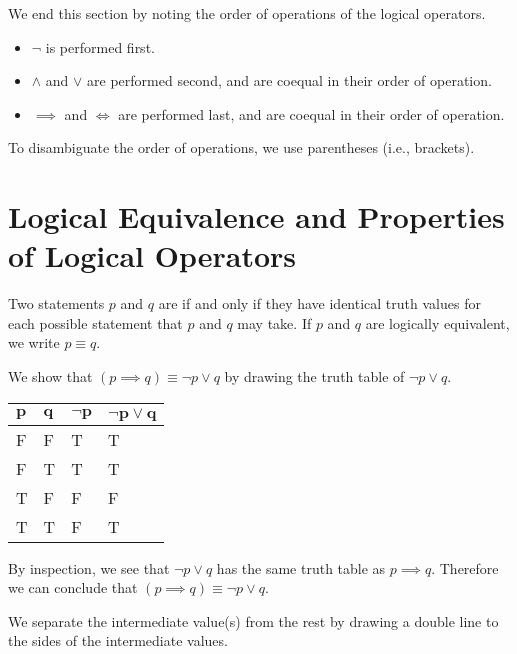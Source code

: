 We end this section by noting the order of operations of the logical operators.
\begin{itemize}
    \item $\lnot$ is performed first.
    \item $\land$ and $\lor$ are performed second, and are coequal in their order of operation.
    \item $\implies$ and $\iff$ are performed last, and are coequal in their order of operation.
\end{itemize}
To disambiguate the order of operations, we use parentheses (i.e., brackets).

\newpage

\section{Logical Equivalence and Properties of Logical Operators}
\begin{definition}
    Two statements $p$ and $q$ are  if and only if they have identical truth values for each possible statement that $p$ and $q$ may take. If $p$ and $q$ are logically equivalent, we write $p \equiv q$.
\end{definition}

\begin{example}\label{example-implication-law}
    We show that $(p \implies q) \equiv \lnot p \lor q$ by drawing the truth table of $\lnot p \lor q$.
    \begin{table}[H]
        \centering
        \begin{tabular}{|l|l||l||l|}
            \hline
            $\boldsymbol{p}$ & $\boldsymbol{q}$ & $\boldsymbol{\lnot p}$ & $\boldsymbol{\lnot p \lor q}$ \\ \hline
            F   & F   & T         & T                  \\ \hline
            F   & T   & T         & T                  \\ \hline
            T   & F   & F         & F                  \\ \hline
            T   & T   & F         & T                  \\ \hline
        \end{tabular}
    \end{table}

    By inspection, we see that $\lnot p \lor q$ has the same truth table as $p \implies q$. Therefore we can conclude that $(p \implies q) \equiv \lnot p \lor q$.
\end{example}
\begin{remark}
    We separate the intermediate value(s) from the rest by drawing a double line to the sides of the intermediate values.
\end{remark}

